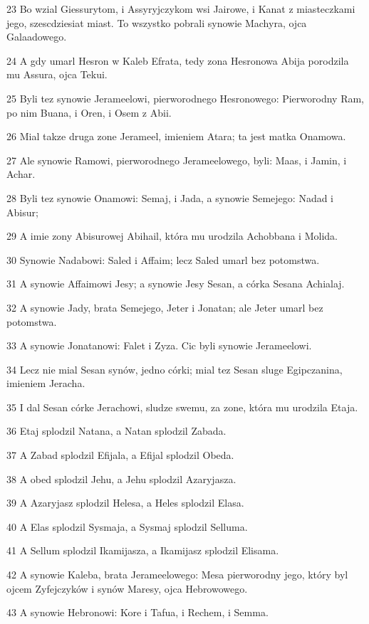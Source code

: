 \par 23 Bo wzial Giessurytom, i Assyryjczykom wsi Jairowe, i Kanat z miasteczkami jego, szescdziesiat miast. To wszystko pobrali synowie Machyra, ojca Galaadowego.
\par 24 A gdy umarl Hesron w Kaleb Efrata, tedy zona Hesronowa Abija porodzila mu Assura, ojca Tekui.
\par 25 Byli tez synowie Jerameelowi, pierworodnego Hesronowego: Pierworodny Ram, po nim Buana, i Oren, i Osem z Abii.
\par 26 Mial takze druga zone Jerameel, imieniem Atara; ta jest matka Onamowa.
\par 27 Ale synowie Ramowi, pierworodnego Jerameelowego, byli: Maas, i Jamin, i Achar.
\par 28 Byli tez synowie Onamowi: Semaj, i Jada, a synowie Semejego: Nadad i Abisur;
\par 29 A imie zony Abisurowej Abihail, która mu urodzila Achobbana i Molida.
\par 30 Synowie Nadabowi: Saled i Affaim; lecz Saled umarl bez potomstwa.
\par 31 A synowie Affaimowi Jesy; a synowie Jesy Sesan, a córka Sesana Achialaj.
\par 32 A synowie Jady, brata Semejego, Jeter i Jonatan; ale Jeter umarl bez potomstwa.
\par 33 A synowie Jonatanowi: Falet i Zyza. Cic byli synowie Jerameelowi.
\par 34 Lecz nie mial Sesan synów, jedno córki; mial tez Sesan sluge Egipczanina, imieniem Jeracha.
\par 35 I dal Sesan córke Jerachowi, sludze swemu, za zone, która mu urodzila Etaja.
\par 36 Etaj splodzil Natana, a Natan splodzil Zabada.
\par 37 A Zabad splodzil Efijala, a Efijal splodzil Obeda.
\par 38 A obed splodzil Jehu, a Jehu splodzil Azaryjasza.
\par 39 A Azaryjasz splodzil Helesa, a Heles splodzil Elasa.
\par 40 A Elas splodzil Sysmaja, a Sysmaj splodzil Selluma.
\par 41 A Sellum splodzil Ikamijasza, a Ikamijasz splodzil Elisama.
\par 42 A synowie Kaleba, brata Jerameelowego: Mesa pierworodny jego, który byl ojcem Zyfejczyków i synów Maresy, ojca Hebrowowego.
\par 43 A synowie Hebronowi: Kore i Tafua, i Rechem, i Semma.
